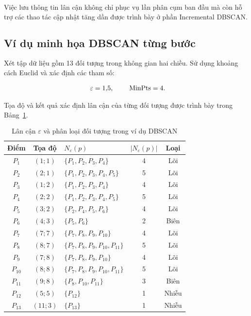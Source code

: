 Việc lưu thông tin lân cận không chỉ phục vụ lần phân cụm ban đầu mà còn hỗ trợ các thao tác cập nhật tăng dần được trình bày ở phần Incremental DBSCAN.

\subsection{Ví dụ minh họa DBSCAN từng bước}

Xét tập dữ liệu gồm 13 đối tượng trong không gian hai chiều. Sử dụng khoảng cách Euclid và xác định các tham số:

\begin{equation}
    \hspace{0.5em}\varepsilon=1{,}5,\qquad\; \mathrm{MinPts}=4.
\end{equation}

Tọa độ và kết quả xác định lân cận của từng đối tượng được trình bày trong Bảng~\ref{tab:dbscan_example}.

\begin{table}[H]
\centering
\caption{Lân cận \(\varepsilon\) và phân loại đối tượng trong ví dụ DBSCAN}
\label{tab:dbscan_example}
\normalsize
\begin{tabular}{|c|c|l|c|c|}\hline
\textbf{Điểm} & \textbf{Tọa độ} & \(N_{\varepsilon}(p)\) &
\(|N_{\varepsilon}(p)|\) & \textbf{Loại} \\\hline
\(P_1\) & \((1;1)\) & \(\{P_1,P_2,P_3,P_4\}\) & 4 & Lõi \\\hline
\(P_2\) & \((2;1)\) & \(\{P_1,P_2,P_3,P_4,P_5\}\) & 5 & Lõi \\\hline
\(P_3\) & \((1;2)\) & \(\{P_1,P_2,P_3,P_4\}\) & 4 & Lõi \\\hline
\(P_4\) & \((2;2)\) & \(\{P_1,P_2,P_3,P_4,P_5\}\) & 5 & Lõi \\\hline
\(P_5\) & \((3;2)\) & \(\{P_2,P_4,P_5,P_6\}\) & 4 & Lõi \\\hline
\(P_6\) & \((4;3)\) & \(\{P_5,P_6\}\) & 2 & Biên \\\hline
\(P_7\) & \((7;7)\) & \(\{P_7,P_8,P_9,P_{10}\}\) & 4 & Lõi \\\hline
\(P_8\) & \((8;7)\) & \(\{P_7,P_8,P_9,P_{10},P_{11}\}\) & 5 & Lõi \\\hline
\(P_9\) & \((7;8)\) & \(\{P_7,P_8,P_9,P_{10}\}\) & 4 & Lõi \\\hline
\(P_{10}\) & \((8;8)\) & \(\{P_7,P_8,P_9,P_{10},P_{11}\}\) & 5 & Lõi \\\hline
\(P_{11}\) & \((9;8)\) & \(\{P_8,P_{10},P_{11}\}\) & 3 & Biên \\\hline
\(P_{12}\) & \((5;5)\) & \(\{P_{12}\}\) & 1 & Nhiễu \\\hline
\(P_{13}\) & \((11;3)\) & \(\{P_{13}\}\) & 1 & Nhiễu \\\hline
\end{tabular}
\end{table}

